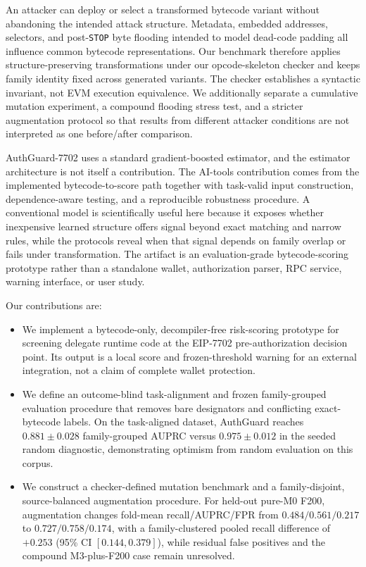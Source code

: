 An attacker can deploy or select a transformed bytecode variant without abandoning the intended attack structure. Metadata, embedded addresses, selectors, and post-\texttt{STOP} byte flooding intended to model dead-code padding all influence common bytecode representations. Our benchmark therefore applies structure-preserving transformations under our opcode-skeleton checker and keeps family identity fixed across generated variants. The checker establishes a syntactic invariant, not EVM execution equivalence. We additionally separate a cumulative mutation experiment, a compound flooding stress test, and a stricter augmentation protocol so that results from different attacker conditions are not interpreted as one before/after comparison.

AuthGuard-7702 uses a standard gradient-boosted estimator, and the estimator architecture is not itself a contribution. The AI-tools contribution comes from the implemented bytecode-to-score path together with task-valid input construction, dependence-aware testing, and a reproducible robustness procedure. A conventional model is scientifically useful here because it exposes whether inexpensive learned structure offers signal beyond exact matching and narrow rules, while the protocols reveal when that signal depends on family overlap or fails under transformation. The artifact is an evaluation-grade bytecode-scoring prototype rather than a standalone wallet, authorization parser, RPC service, warning interface, or user study.

Our contributions are:
\begin{itemize}
  \item We implement a bytecode-only, decompiler-free risk-scoring prototype for screening delegate runtime code at the EIP-7702 pre-authorization decision point. Its output is a local score and frozen-threshold warning for an external integration, not a claim of complete wallet protection.
  \item We define an outcome-blind task-alignment and frozen family-grouped evaluation procedure that removes bare designators and conflicting exact-bytecode labels. On the task-aligned dataset, AuthGuard reaches $0.881\pm0.028$ family-grouped AUPRC versus $0.975\pm0.012$ in the seeded random diagnostic, demonstrating optimism from random evaluation on this corpus.
  \item We construct a checker-defined mutation benchmark and a family-disjoint, source-balanced augmentation procedure. For held-out pure-M0 F200, augmentation changes fold-mean recall/AUPRC/FPR from $0.484/0.561/0.217$ to $0.727/0.758/0.174$, with a family-clustered pooled recall difference of $+0.253$ (95\% CI $[0.144,0.379]$), while residual false positives and the compound M3-plus-F200 case remain unresolved.
\end{itemize}

